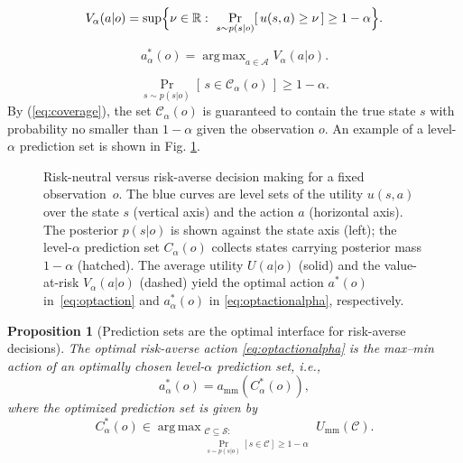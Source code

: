 \documentclass[10pt,a4paper]{amsart}
\newtheorem{proposition}{Proposition}
\newcommand{\Aset}{\mathcal{A}}
\newcommand{\R}{\mathbb{R}}
\newcommand{\Sset}{\mathcal{S}}
\DeclareMathOperator*{\argmax}{arg\,max}
\begin{document}
\begin{equation}
\label{eq:var}
V_\alpha(a| o)=\sup\Bigl\{\nu\in\R:\
\Pr_{s\sim p(s| o)}\!\left[\,u(s,a)\ge\nu\,\right]\ge 1-\alpha\Bigr\}.
\end{equation}

\begin{equation}\label{eq:optactionalpha}
a_\alpha^*(o)=\argmax_{a \in \Aset} V_\alpha(a| o).
\end{equation}

\begin{equation}
\label{eq:coverage}
\Pr_{s\sim p(s| o)}\!\left[\,s\in \mathcal{C}_{\alpha}(o)\,\right]\ge 1-\alpha.
\end{equation} By (\ref{eq:coverage}), the set $\mathcal{C}_{\alpha}(o)$ is guaranteed to contain the true state $s$ with probability no smaller than $1-\alpha$ given the observation $o$. An example of a level-$\alpha$ prediction set is shown in Fig. \ref{fig:ex}.

\begin{figure}[t]
  \centering
  \caption{Risk-neutral versus risk-averse decision making for a fixed
  observation~$o$. The  blue curves are level sets of the utility
  $u(s,a)$ over the state $s$ (vertical axis) and the action $a$
  (horizontal axis). The posterior $p(s|o)$ is shown against the
  state axis (left); the level-$\alpha$ prediction set $C_\alpha(o)$
  collects states carrying posterior mass $1-\alpha$ (hatched). 
  The average utility $U(a| o)$
  (solid) and the value-at-risk $V_\alpha(a| o)$ (dashed) yield the optimal action $a^*(o)$ in~\eqref{eq:optaction} and 
  $a^*_\alpha(o)$ in \eqref{eq:optactionalpha}, respectively. }
  \label{fig:ex}
\end{figure}

\begin{proposition}[Prediction sets are the optimal interface for risk-averse decisions]
\label{prop:ra}
The optimal risk-averse action \eqref{eq:optactionalpha} is the max--min
action of an optimally chosen level-$\alpha$ prediction set, i.e., 
\begin{equation}
\label{eq:raset}
a_\alpha^*(o)=a_{\mathrm{mm}}\!\left(C_\alpha^*(o)\right),
\end{equation}
where the optimized prediction set is given by
\begin{equation}
\label{eq:optset}
C_\alpha^*(o)\in\!\!\argmax_{\substack{\mathcal{C}\subseteq\Sset:\\ \Pr_{s\sim p(s| o)}[s\in \mathcal{C}]\ge 1-\alpha}}\!\!U_{\mathrm{mm}}(\mathcal{C}).
\end{equation}
\end{proposition}
\end{document}
